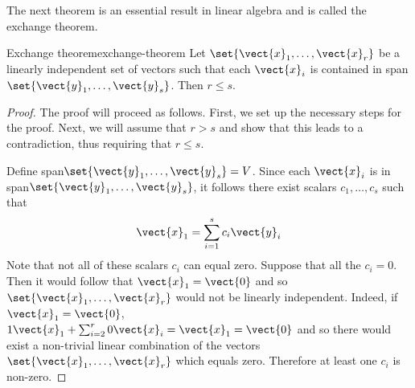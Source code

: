 The next theorem is an essential result in linear algebra and is
called the exchange theorem.

\begin{theorem}{Exchange theorem}{exchange-theorem}
  Let $\set{\vect{x}_{1},\ldots,\vect{x}_{r}} $ be a linearly
  independent set of vectors such that each $\vect{x}_{i}$ is
  contained in span$\set{\vect{y}_{1},\ldots,\vect{y}_{s}}$. Then
  $ r\leq s$.
\end{theorem}

\begin{proof}
  The proof will proceed as follows. First, we set up the necessary
  steps for the proof. Next, we will assume that $r > s$ and show that
  this leads to a contradiction, thus requiring that $r \leq s$.

  Define span$\set{\vect{y}_{1},\ldots,\vect{y}_{s}} = V$. Since each
  $\vect{x}_i$ is in span$\set{\vect{y}_{1},\ldots,\vect{y}_{s}}$, it
  follows there exist scalars $c_{1},\ldots,c_{s}$ such that
  \begin{equation}
    \vect{x}_{1}=\sum_{i=1}^{s}c_{i}\vect{y}_{i}  \label{linear-comb}
  \end{equation}
  Note that not all of these scalars $c_i$ can equal zero. Suppose
  that all the $c_i=0$. Then it would follow that
  $\vect{x}_{1}=\vect{0}$ and so
  $\set{\vect{x} _{1},\ldots,\vect{x}_{r}} $ would not be linearly
  independent.  Indeed, if $\vect{x}_{1}=\vect{0}$,
  $1\vect{x}_{1}+\sum_{i=2}^{r}0 \vect{x}_{i}=\vect{x}_{1}=\vect{0}$
  and so there would exist a non-trivial linear combination of the
  vectors $\set{\vect{x}_{1},\ldots, \vect{x}_{r}} $ which equals
  zero. Therefore at least one $c_i$ is non-zero.


\end{proof}
